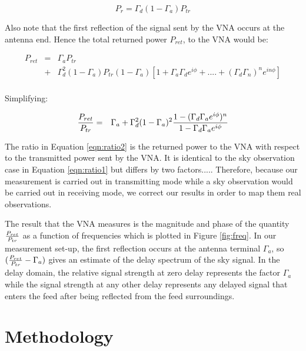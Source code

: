 \documentclass[12pt,preprint]{aastex}
\begin{document}
\begin{equation}
P_{r}= \Gamma_{d}(1-\Gamma_a) P_{tr}
\end{equation}

Also note that the first reflection of the signal sent by the VNA occurs at the antenna end. Hence the total returned power $P_{ret}$, to the VNA  would be:

\begin{eqnarray}
P_{ret} & = & \Gamma_{a}P_{tr} \nonumber\\ 
 & + &   \Gamma_{d}^{2}(1-\Gamma_a) P_{tr}(1-\Gamma_{a}) [1+ \Gamma_{a}\Gamma_{d} e^{i\phi}+  ....+ (\Gamma_{d}\Gamma_{n})^{n}e^{in\phi}]\nonumber\\
 \end{eqnarray}
 
Simplifying:
 
  \begin{eqnarray}\label{eqn:ratio2}
 {P_{ret} \over P_{tr} } & = & \Gamma_{a}
  +  \Gamma_{d}^{2}(1-\Gamma_a)^{2}  {1-(\Gamma_{d}\Gamma_{a}e^{i\phi})^{n} \over 1-\Gamma_{d} \Gamma_{a}e^{i\phi} } \nonumber\\
\end{eqnarray}

The ratio in Equation \ref{eqn:ratio2} is the returned power to the VNA with
respect to the transmitted power sent by the VNA. It is identical to the sky
observation case in Equation \ref{eqn:ratio1} but differs by two factors.....  Therefore, because our measurement is carried out in transmitting mode
while a sky observation would be carried out in receiving mode, we correct our
results in order to map them real observations.

The result that the VNA measures is the magnitude and phase of the quantity
${P_{ret}\over P_{tr}}$ as a function of frequencies which is plotted in Figure
\ref{fig:freq}. In our measurement set-up, the first reflection occurs at the
antenna terminal $\Gamma_{a}$, so $({P_{ret} \over P_{tr} }  - \Gamma_{a}) $
gives an estimate of the delay spectrum of the sky signal. In the delay domain,
the relative signal strength at zero delay represents the factor $\Gamma_{a}$
while the signal strength at any other delay represents any delayed signal that
enters the feed after being reflected from the feed surroundings. 

\section{Methodology}{\label{sec:methods}}
\end{document}
